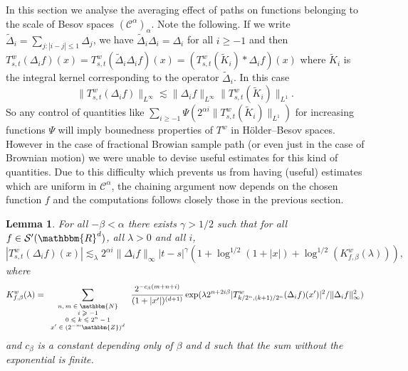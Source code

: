 \documentclass[a4paper,11pt]{article}
\newcommand{\tmscript}[1]{\text{\scriptsize{$#1$}}}
\newtheorem{lemma}[theorem]{Lemma}
\newcommand{\CC}{\mathscr C}
\begin{document}
In this section we analyse the averaging effect of paths on functions
belonging to the scale of Besov spaces $( \CC^{\alpha} )_{\alpha}$. Note the following. If we write $\tilde \Delta_i = \sum_{j:|i-j|\le 1} \Delta_j$, we have $\tilde \Delta_i \Delta _i = \Delta _i$ for all  $i\ge -1$  and then
$
T^{w}_{s,t} ( \Delta_{i} f ) ( x ) =T^{w}_{s,t} ( \tilde \Delta_{i} \Delta_{i} f ) ( x ) =(T^{w}_{s,t} ( \tilde K_{i}  ) * \Delta_{i} f) ( x )
$
where $\tilde K_i$ is the integral kernel corresponding to the operator $\tilde \Delta_{i}$. In this case
\[
\|T^{w}_{s,t} ( \Delta_{i} f )\|_{L^\infty} \lesssim \| \Delta_{i} f \|_{L^\infty}  \|T^{w}_{s,t} ( \tilde K_{i} )\|_{L^1} .
\]
So any control of quantities like
$
\sum_{i \ge -1} \Psi(2^{\alpha i} \|T^{w}_{s,t} ( \tilde K_{i} )\|_{L^1})
$
for increasing functions $\Psi$ will imply bounedness properties of $T^w$ in H\"older--Besov spaces. However in the case of fractional Browian sample path (or even just in the case of Brownian motion) we were unable to devise useful estimates for this kind of quantities.
Due to this difficulty which prevents us from having (useful) estimates which are uniform in $\CC^{\alpha}$,  the chaining argument now depends on the chosen function $f$ and the computations follows closely those in the previous section.

\begin{lemma}
  \label{lemma:chaining_besov}For all $- \beta < \alpha$ there exists $\gamma
  >1/2$ such that for all $f \in \mathcal{S}' ( \mathbbm{R}^{d} )$, all
  $\lambda >0$ and all $i$,
  \[ | T^{w}_{s,t} ( \Delta_{i} f ) ( x ) | \lesssim_{\lambda} 2^{\alpha i}
     \| \Delta_{i} f \|_{\infty} | t-s |^{\gamma} ( 1+ \log^{1/2} ( 1+ | x | )
     + \log^{1/2} ( K^{w}_{f, \beta} ( \lambda ) ) ), \]
  where
  \[ K_{f, \beta}^{w} ( \lambda ) = \sum_{\tmscript{\begin{array}{c}
       n,m \in \mathbbm{N}\\
       i \geqslant -1\\
       0 \leqslant k \leqslant 2^{n} -1\\
       x' \in ( 2^{-m} \mathbbm{Z} )^{d}
     \end{array}}} \frac{2^{-c_{\beta} ( m+n+i )}} {( 1+ | x' | )^{( d+1 )}} \exp (
     \lambda 2^{n+2i \beta} | T^{w}_{k/2^{n} , ( k+1 ) /2^{n}} ( \Delta_{i} f
     ) ( x' ) |^{2} / \| \Delta_{i} f \|_{\infty}^{2} ) \]
  and $c_{\beta}$ is a constant depending only of $\beta$ and $d$ such that
  the sum without the exponential is finite.
\end{lemma}
\end{document}
